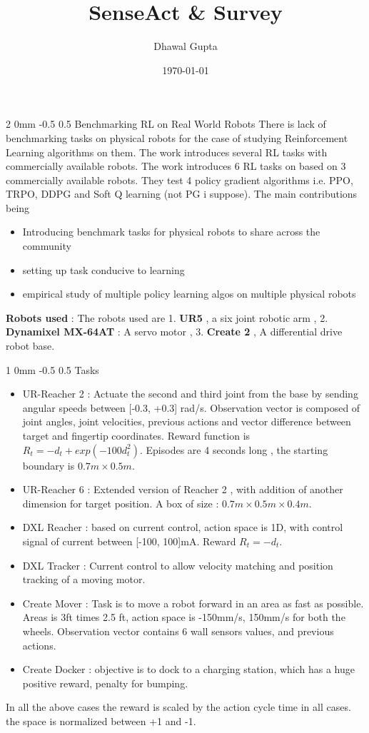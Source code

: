 \documentclass[twocolumn,11pt]{article}
\title{SenseAct \& Survey }
\author{Dhawal Gupta}
\date{\today}
\makeatletter
\renewcommand{\section}{\@startsection
{section}%
{2}%
{0mm}%
{-0.5\baselineskip}%
{0.5\baselineskip}%
{\bfseries\color{blue}}} %
\renewcommand{\subsection}{\@startsection
{subsection}%
{1}%
{0mm}%
{-0.5\baselineskip}%
{0.5\baselineskip}%
{\bfseries\color{blue}}} %
\makeatother
\begin{document}
\maketitle

\section{Benchmarking RL on Real World Robots}
There is lack of benchmarking tasks on physical robots for the case of studying Reinforcement Learning algorithms  on them. The  work introduces several RL  tasks with commercially available robots. The  work  introduces 6 RL  tasks on based on 3  commercially available robots. They test 4 policy gradient algorithms i.e.  PPO,  TRPO, DDPG and Soft Q learning (not PG i suppose). The main contributions being 
\begin{itemize}
\item Introducing benchmark tasks for physical robots to share  across the community
\item setting up task conducive to learning
\item empirical  study  of multiple policy learning algos on multiple physical robots
\end{itemize} 
\textbf{Robots used}  : The robots used are 1. \textbf{UR5}  ,  a six joint robotic arm , 2. \textbf{Dynamixel  MX-64AT}  : A servo motor , 3. \textbf{Create 2} , A differential drive robot base.
\subsection{Tasks}
\begin{itemize}
\item UR-Reacher 2 : Actuate the second and third joint from the base by sending angular speeds between [-0.3, +0.3] rad/s. Observation vector is composed of joint angles, joint velocities, previous actions and vector difference between target and fingertip coordinates. Reward function is $R_t = - d_t  + exp(-100 d_t^2)$. Episodes are 4  seconds long , the starting boundary is $0.7m \times 0.5m$.
\item UR-Reacher 6 : Extended version of Reacher 2  , with addition of another dimension for target position. A box of size : $0.7m \times 0.5m \times 0.4m$.
\item DXL Reacher : based  on current control, action space is 1D, with control signal  of current between [-100, 100]mA. Reward $R_t = -d_t$.
\item DXL Tracker : Current  control to allow velocity matching and position tracking of a moving motor. 
\item Create Mover : Task is to move a robot forward in an area as fast as possible. Areas is 3ft times  2.5 ft, action space is -150mm/s, 150mm/s  for both the wheels. Observation vector contains 6 wall sensors values, and previous actions. 
\item Create  Docker : objective is to dock to a charging station, which  has a huge positive reward, penalty for bumping. 
\end{itemize}
In all the above cases the reward is scaled by the action cycle time in all cases. the  space is normalized between +1  and -1.
\end{document}
